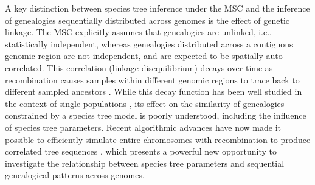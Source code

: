 \documentclass[11pt]{article}
\begin{document}


A key distinction between species tree inference under the MSC and the inference of genealogies sequentially distributed across genomes is the effect of genetic linkage. The MSC explicitly assumes that genealogies are unlinked, i.e., statistically independent, whereas genealogies distributed across a contiguous genomic region are not independent, and are expected to be spatially auto-correlated. This correlation (linkage disequilibrium) decays over time as recombination causes samples within different genomic regions to trace back to different sampled ancestors \citep{hudson_coalescent_1988}. While this decay function has been well studied in the context of single populations \citep{mcvean_approximating_2005}, its effect on the similarity of genealogies constrained by a species tree model is poorly understood, including the influence of species tree parameters. Recent algorithmic advances have now made it possible to efficiently simulate entire chromosomes with recombination to produce correlated tree sequences \citep{kelleher_efficient_2016}, which presents a powerful new opportunity to investigate the relationship between species tree parameters and sequential genealogical patterns across genomes.
\end{document}
